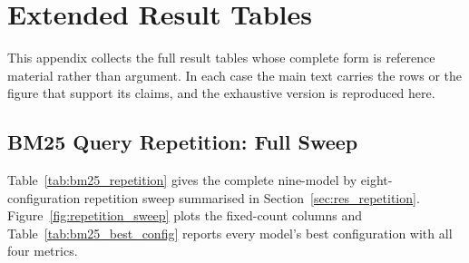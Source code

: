 \chapter{Extended Result Tables}
\setcounter{page}{1}
\label{app:tables}

This appendix collects the full result tables whose complete form is reference
material rather than argument. In each case the main text carries the rows or the
figure that support its claims, and the exhaustive version is reproduced here.

\section{BM25 Query Repetition: Full Sweep}
\label{app:tab_repetition}

Table~\ref{tab:bm25_repetition} gives the complete nine-model by eight-configuration
repetition sweep summarised in Section~\ref{sec:res_repetition}. Figure~\ref{fig:repetition_sweep}
plots the fixed-count columns and Table~\ref{tab:bm25_best_config} reports every
model's best configuration with all four metrics.

